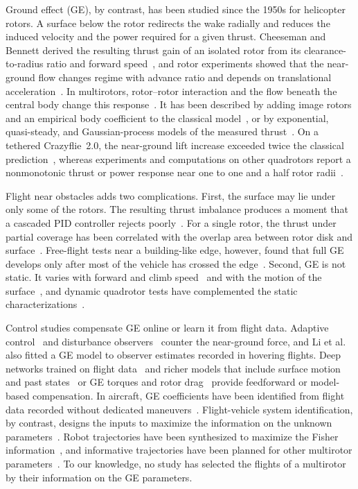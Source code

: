\documentclass[journal]{IEEEtran}
\begin{document}
Ground effect (GE), by contrast, has been studied since the 1950s for helicopter rotors. A surface below the rotor redirects the wake radially and reduces the induced velocity and the power required for a given thrust. Cheeseman and Bennett derived the resulting thrust gain of an isolated rotor from its clearance-to-radius ratio and forward speed~\cite{CheesemanBennett1955}, and rotor experiments showed that the near-ground flow changes regime with advance ratio and depends on translational acceleration~\cite{Curtiss1984}. In multirotors, rotor--rotor interaction and the flow beneath the central body change this response~\cite{Matus2020}. It has been described by adding image rotors and an empirical body coefficient to the classical model~\cite{SanchezCuevas2017}, or by exponential, quasi-steady, and Gaussian-process models of the measured thrust~\cite{He2019,HeLeang2020,Franzetti2024ICUAS}. On a tethered Crazyflie~2.0, the near-ground lift increase exceeded twice the classical prediction~\cite{Carter2021}, whereas experiments and computations on other quadrotors report a nonmonotonic thrust or power response near one to one and a half rotor radii~\cite{Tanabe2021,Lei2026}.

Flight near obstacles adds two complications. First, the surface may lie under only some of the rotors. The resulting thrust imbalance produces a moment that a cascaded PID controller rejects poorly~\cite{SanchezCuevas2017}. For a single rotor, the thrust under partial coverage has been correlated with the overlap area between rotor disk and surface~\cite{Yon2026}. Free-flight tests near a building-like edge, however, found that full GE develops only after most of the vehicle has crossed the edge~\cite{Herz2026}. Second, GE is not static. It varies with forward and climb speed~\cite{Kan2019,HeLeang2025} and with the motion of the surface~\cite{He2024}, and dynamic quadrotor tests have complemented the static characterizations~\cite{DelContBernard2017}.

Control studies compensate GE online or learn it from flight data. Adaptive control~\cite{Wei2019} and disturbance observers~\cite{He2019,LiX2024} counter the near-ground force, and Li et al.~\cite{LiX2024} also fitted a GE model to observer estimates recorded in hovering flights. Deep networks trained on flight data~\cite{Shi2019} and richer models that include surface motion and past states~\cite{He2024} or GE torques and rotor drag~\cite{Yang2025} provide feedforward or model-based compensation. In aircraft, GE coefficients have been identified from flight data recorded without dedicated maneuvers~\cite{Vitale2010}. Flight-vehicle system identification, by contrast, designs the inputs to maximize the information on the unknown parameters~\cite{Mehra1974,Jategaonkar2015,Morelli2016}. Robot trajectories have been synthesized to maximize the Fisher information~\cite{Wilson2014}, and informative trajectories have been planned for other multirotor parameters~\cite{Bahnemann2017}. To our knowledge, no study has selected the flights of a multirotor by their information on the GE parameters.
\end{document}
